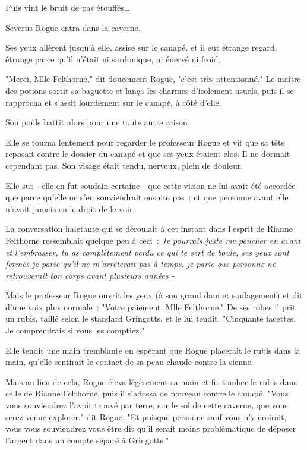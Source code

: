 Puis vint le bruit de pas étouffés…

Severus Rogue entra dans la caverne.

Ses yeux allèrent jusqu'à elle, assise sur le canapé, et il eut étrange regard, étrange parce qu'il n'était ni sardonique, ni énervé ni froid.

"Merci, Mlle Felthorne," dit doucement Rogue, "c'est très attentionné." Le maître des potions sortit sa baguette et lança les charmes d'isolement usuels, puis il se rapprocha et s'assit lourdement sur le canapé, à côté d'elle.

Son pouls battit alors pour une toute autre raison.

Elle se tourna lentement pour regarder le professeur Rogue et vit que sa tête reposait contre le dossier du canapé et que ses yeux étaient clos. Il ne dormait cependant pas. Son visage était tendu, nerveux, plein de douleur.

Elle sut - elle en fut soudain certaine - que cette vision ne lui avait été accordée que parce qu'elle ne s'en souviendrait ensuite pas~; et que personne avant elle n'avait jamais eu le droit de le voir.

La conversation haletante qui se déroulait à cet instant dans l'esprit de Rianne Felthorne ressemblait quelque peu à ceci~: \emph{Je pourrais juste me pencher en avant et l'embrasser, tu as complètement perdu ce qui te sert de boule, ses yeux sont fermés je parie qu'il ne m'arrêterait pas à temps, je parie que personne ne retrouverait ton corps avant plusieurs années -}

Mais le professeur Rogue ouvrit les yeux (à son grand dam et soulagement) et dit d'une voix plus normale~: "Votre paiement, Mlle Felthorne." De ses robes il prit un rubis, taillé selon le standard Gringotts, et le lui tendit. "Cinquante facettes. Je comprendrais si vous les comptiez."

Elle tendit une main tremblante en espérant que Rogue placerait le rubis dans la main, qu'elle sentirait le contact de sa peau chaude contre la sienne -

Mais au lieu de cela, Rogue éleva légèrement sa main et fit tomber le rubis dans celle de Rianne Felthorne, puis il s'adossa de nouveau contre le canapé. "Vous vous souviendrez l'avoir trouvé par terre, sur le sol de cette caverne, que vous serez venue explorer," dit Rogue. "Et puisque personne sauf vous n'y croirait, vous vous souviendrez vous être dit qu'il serait moins problématique de déposer l'argent dans un compte séparé à Gringotts."

